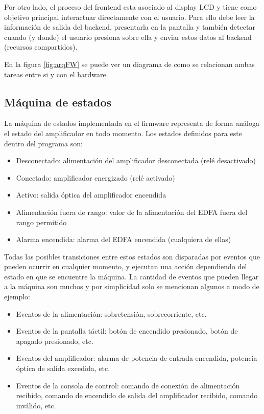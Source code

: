 Por otro lado, el proceso del frontend esta asociado al display LCD y tiene como objetivo principal interactuar directamente con el usuario. Para ello debe leer la información de salida del backend, presentarla en la pantalla y también detectar cuando (y donde) el usuario presiona sobre ella y enviar estos datos al backend (recursos compartidos). 

En la figura \ref{fig:arqFW} se puede ver un diagrama de como se relacionan ambas tareas entre si y con el hardware.


\subsection{Máquina de estados}

La máquina de estados implementada en el firmware representa de forma análoga el estado del amplificador en todo momento. Los estados definidos para este dentro del programa son:

\begin{itemize}
\item Desconectado: alimentación del amplificador desconectada (relé desactivado)
\item Conectado: amplificador energizado (relé activado)
\item Activo: salida óptica del amplificador encendida
\item Alimentación fuera de rango: valor de la alimentación del EDFA fuera del rango permitido
\item Alarma encendida: alarma del EDFA encendida (cualquiera de ellas)
\end{itemize}

Todas las posibles transiciones entre estos estados son disparadas por eventos que pueden ocurrir en cualquier momento, y ejecutan una acción dependiendo del estado en que se encuentre la máquina. La cantidad de eventos que pueden llegar a la máquina son muchos y por simplicidad solo se mencionan algunos a modo de ejemplo:

\begin{itemize}
\item Eventos de la alimentación: sobretensión, sobrecorriente, etc.
\item Eventos de la pantalla táctil: botón de encendido presionado, botón de apagado presionado, etc.
\item Eventos del amplificador: alarma de potencia de entrada encendida, potencia óptica de salida excedida, etc.
\item Eventos de la consola de control: comando de conexión de alimentación recibido, comando de encendido de salida del amplificador recibido, comando inválido, etc.
\end{itemize}

